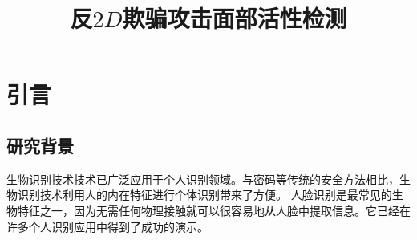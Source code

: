 \documentclass[conference]{IEEEtran}
\renewcommand{\abstractname}{{\hei 摘要}}
\begin{document}
%
\title{反$2D$欺骗攻击面部活性检测}


\author{\IEEEauthorblockN{}
\and
{}
\and
\IEEEauthorblockN{}
}

\maketitle

\section{引言}

\subsection{研究背景}
生物识别技术技术已广泛应用于个人识别领域。与密码等传统的安全方法相比，生物识别技术利用人的内在特征进行个体识别带来了方便。
人脸识别是最常见的生物特征之一，因为无需任何物理接触就可以很容易地从人脸中提取信息。它已经在许多个人识别应用中得到了成功的演示。
\end{document}
